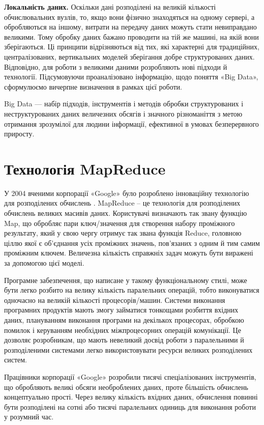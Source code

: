 \textbf{Локальність даних.} Оскільки дані розподілені на великій кількості обчислювальних вузлів,
то, якщо вони фізично знаходяться на одному сервері,
а обробляються на іншому, витрати на передачу даних можуть стати невиправдано великими.
Тому обробку даних бажано проводити на тій же машині, на якій вони зберігаються.
Ці принципи відрізняються від тих, які характерні для традиційних, централізованих, вертикальних моделей зберігання добре структурованих даних. Відповідно, для роботи з великими даними розробляють нові підходи й технології.
Підсумовуючи проаналізовано інформацію,
щодо поняття «Big Data», сформулюємо вичерпне визначення в рамках цієї роботи.

Big Data — набір підходів, інструментів і методів обробки структурованих і неструктурованих даних величезних обсягів і значного різноманіття з метою отримання зрозумілої для людини інформації, ефективної в умовах безперервного приросту.

\section{Технологія MapReduce}

У 2004 вченими корпорації «Google» було розроблено інноваційну технологію для розподілених обчислень \cite{GoogleMapReduce}.
MapReduce – це технологія для розподілених обчислень великих масивів даних.
Користувачі визначають так звану функцію Map, що обробляє
пари ключ/значення для створення набору проміжного результату, який у свою чергу отримує
так звана функція Reduce, головною ціллю якої є об'єднання усіх проміжних значень, пов'язаних з одним й тим самим проміжним ключем.
Величезна кількість справжніх задач можуть бути виражені за допомогою цієї моделі.

Програмне забезпечення, що написане у такому функціональному стилі,
може бути легко розбито на велику кількість паралельних операцій, тобто виконуватися одночасно на
великій кількості процесорів/машин.
Системи виконання програмних продуктів мають змогу займатися
тонкощами розбиття вхідних даних, плануванням виконання програми на декількох процесорах,
обробкою помилок і керуванням необхідних міжпроцесорних операцій комунікації.
Це дозволяє розробникам, що мають невеликий досвід роботи з паралельними
й розподіленими системами легко використовувати ресурси великих розподілених систем.

Працівники корпорації «Google» розробили тисячі спеціалізованих
інструментів, що обробляють великі обсяги необроблених даних,
проте більшість обчислень концептуально прості.
Через велику кількість вхідних даних, обчислення повинні бути розподілені на
сотні або тисячі паралельних одиниць для виконання роботи у розумний час.

